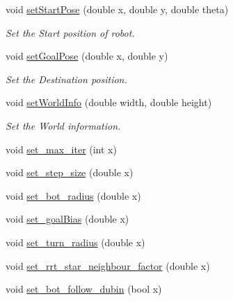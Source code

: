\begin{DoxyCompactItemize}
void \hyperlink{classRRTSTAR_a79020afd3dae6e89caca9704810db7fd}{set\+Start\+Pose} (double x, double y, double theta)
\begin{DoxyCompactList}\small\item\em Set the Start position of robot. \end{DoxyCompactList}\item 
void \hyperlink{classRRTSTAR_af4f27caedca02db30d70e07ec5a35a34}{set\+Goal\+Pose} (double x, double y)
\begin{DoxyCompactList}\small\item\em Set the Destination position. \end{DoxyCompactList}\item 
void \hyperlink{classRRTSTAR_ac9e0362f930ea0794eb94f30a34b9147}{set\+World\+Info} (double width, double height)
\begin{DoxyCompactList}\small\item\em Set the World information. \end{DoxyCompactList}\item 
void \hyperlink{classRRTSTAR_a85a72ab7c47e0fcf1d464a75af1ed309}{set\+\_\+max\+\_\+iter} (int x)
\item 
void \hyperlink{classRRTSTAR_ad0f94ca8a2bfddd676adca784bf69c07}{set\+\_\+step\+\_\+size} (double x)
\item 
void \hyperlink{classRRTSTAR_a92d71705680b9cdfe3b42982168e320a}{set\+\_\+bot\+\_\+radius} (double x)
\item 
void \hyperlink{classRRTSTAR_a4e57768e18f20604fffd50cd5a60af8d}{set\+\_\+goal\+Bias} (double x)
\item 
void \hyperlink{classRRTSTAR_a1a65e27cb565f2adf789dd582252a8a6}{set\+\_\+turn\+\_\+radius} (double x)
\item 
void \hyperlink{classRRTSTAR_a297bbde6f019ac7ae876ce9c2608cd9b}{set\+\_\+rrt\+\_\+star\+\_\+neighbour\+\_\+factor} (double x)
\item 
void \hyperlink{classRRTSTAR_a6b06cbc77a08446e0c97b8da9786afd6}{set\+\_\+bot\+\_\+follow\+\_\+dubin} (bool x)
\end{DoxyCompactItemize}
